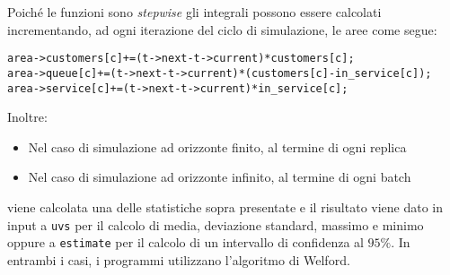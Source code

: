 Poiché le funzioni sono \textit{stepwise} gli integrali possono essere calcolati incrementando, ad ogni iterazione del ciclo di simulazione, le aree come segue:
\begin{lstlisting}[caption={Calcolo degli integrali}]
area->customers[c]+=(t->next-t->current)*customers[c];
area->queue[c]+=(t->next-t->current)*(customers[c]-in_service[c]);
area->service[c]+=(t->next-t->current)*in_service[c];
\end{lstlisting}

Inoltre:
\begin{itemize}
\item Nel caso di simulazione ad orizzonte finito, al termine di ogni replica 
\item Nel caso di simulazione ad orizzonte infinito, al termine di ogni batch
\end{itemize}
viene calcolata una delle statistiche sopra presentate e il risultato viene dato in input a \texttt{uvs} per il calcolo di media, deviazione standard, massimo e minimo oppure a \texttt{estimate} per il calcolo di un intervallo di confidenza al $95\%$. In entrambi i casi, i programmi utilizzano l'algoritmo di Welford.